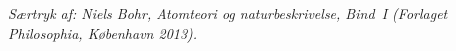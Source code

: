\documentclass[12pt,a4paper]{article}
\begin{document}
\thispagestyle{fancy}
{\footnotesize\itshape Særtryk af: Niels Bohr, \emph{Atomteori og naturbeskrivelse}, Bind~I
 (Forlaget Philosophia, K\o{}benhavn 2013).\par}
\medskip


\end{document}
